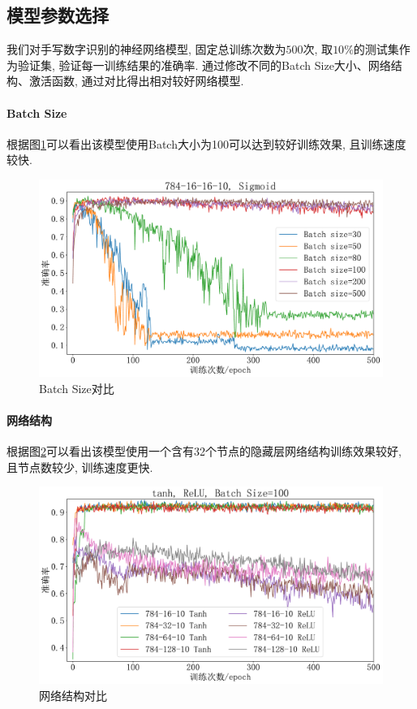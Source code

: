 \documentclass[12pt, a4paper, oneside]{ctexart}
\begin{document}
\subsection{模型参数选择}
我们对手写数字识别的神经网络模型, 固定总训练次数为$500$次, 取$10\%$的测试集作为验证集, 验证每一训练结果的准确率. 通过修改不同的Batch Size大小、网络结构、激活函数, 通过对比得出相对较好网络模型.
\paragraph{Batch Size}
根据图\ref{figure-diff_batch_size}可以看出该模型使用Batch大小为100可以达到较好训练效果, 且训练速度较快.
\begin{figure}[!h]
    \centering
    \includegraphics[scale=0.45]{diff_batch_size.pdf}
    \caption{Batch Size对比}
    \label{figure-diff_batch_size}
\end{figure}
\paragraph{网络结构}
根据图\ref{figure-diff_struct}可以看出该模型使用一个含有32个节点的隐藏层网络结构训练效果较好, 且节点数较少, 训练速度更快.
\begin{figure}[htbp]
    \centering
    \includegraphics[scale=0.45]{diff_struct.pdf}
    \caption{网络结构对比}
    \label{figure-diff_struct}
\end{figure}\vspace{-2ex}
\end{document}

